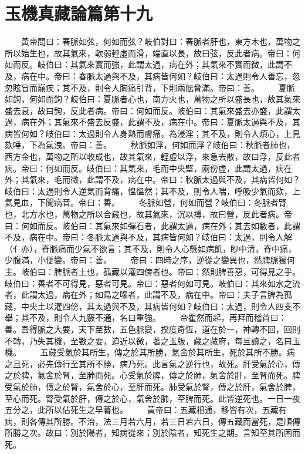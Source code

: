 \section{玉機真藏論篇第十九}

　　黃帝問曰：春脈如弦，何如而弦？岐伯對曰：春脈者肝也，東方木也，萬物之所以始生也，故其氣來，軟弱輕虛而滑，端直以長，故曰弦，反此者病。帝曰：何如而反。岐伯曰：其氣來實而強，此謂太過，病在外；其氣來不實而微，此謂不及，病在中。帝曰：春脈太過與不及，其病皆何如？岐伯曰：太過則令人善忘，忽忽眩冒而巔疾；其不及，則令人胸痛引背，下則兩胠脅滿。帝曰：善。
　　夏脈如鉤，何如而鉤？岐伯曰：夏脈者心也，南方火也，萬物之所以盛長也，故其氣來盛去衰，故曰鉤，反此者病。帝曰：何如而反。岐伯曰：其氣來盛去亦盛，此謂太過，病在外；其氣來不盛去反盛，此謂不及，病在中。帝曰：夏脈太過與不及，其病皆何如？岐伯曰：太過則令人身熱而膚痛，為浸淫；其不及，則令人煩心，上見欬唾，下為氣洩。帝曰：善。
　　秋脈如浮，何如而浮？岐伯曰：秋脈者肺也，西方金也，萬物之所以收成也，故其氣來，輕虛以浮，來急去散，故曰浮，反此者病。帝曰：何如而反。岐伯曰：其氣來，毛而中央堅，兩傍虛，此謂太過，病在外；其氣來，毛而微，此謂不及，病在中。帝曰：秋脈太過與不及，其病皆何如？岐伯曰：太過則令人逆氣而背痛，慍慍然；其不及，則令人喘，呼吸少氣而欬，上氣見血，下聞病音。帝曰：善。
　　冬脈如營，何如而營？岐伯曰：冬脈者腎也，北方水也，萬物之所以合藏也，故其氣來，沉以搏，故曰營，反此者病。帝曰：何如而反。岐伯曰：其氣來如彈石者，此謂太過，病在外；其去如數者，此謂不及，病在中。帝曰：冬脈太過與不及，其病皆何如？岐伯曰：太過，則令人解（亻亦），脊脈痛而少氣不欲言；其不及，則令人心懸如病飢，眇中清，脊中痛，少腹滿，小便變。帝曰：善。
　　帝曰：四時之序，逆從之變異也，然脾脈獨何主。岐伯曰：脾脈者土也，孤藏以灌四傍者也。帝曰：然則脾善惡，可得見之乎。岐伯曰：善者不可得見，惡者可見。帝曰：惡者何如可見。岐伯曰：其來如水之流者，此謂太過，病在外；如鳥之喙者，此謂不及，病在中。帝曰：夫子言脾為孤藏，中央土以灌四傍，其太過與不及，其病皆何如？岐伯曰：太過，則令人四支不舉；其不及，則令人九竅不通，名曰重強。
　　帝瞿然而起，再拜而稽首曰：善。吾得脈之大要，天下至數，五色脈變，揆度奇恆，道在於一，神轉不回，回則不轉，乃失其機，至數之要，迫近以微，著之玉版，藏之藏府，每旦讀之，名曰玉機。
　　五藏受氣於其所生，傳之於其所勝，氣舍於其所生，死於其所不勝。病之且死，必先傳行至其所不勝，病乃死。此言氣之逆行也，故死。肝受氣於心，傳之於脾，氣舍於腎，至肺而死。心受氣於脾，傳之於肺，氣舍於肝，至腎而死。脾受氣於肺，傳之於腎，氣舍於心，至肝而死。肺受氣於腎，傳之於肝，氣舍於脾，至心而死。腎受氣於肝，傳之於心，氣舍於肺，至脾而死。此皆逆死也。一日一夜五分之，此所以佔死生之早暮也。
　　黃帝曰：五藏相通，移皆有次，五藏有病，則各傳其所勝。不治，法三月若六月，若三日若六日，傳五藏而當死，是順傳所勝之次。故曰：別於陽者，知病從來；別於陰者，知死生之期。言知至其所困而死。
